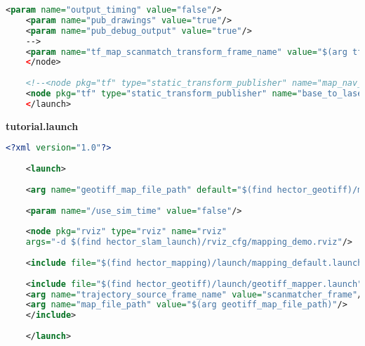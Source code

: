\begin{appendices}
\begin{lstlisting}[language=XML]
	<param name="output_timing" value="false"/>
	<param name="pub_drawings" value="true"/>
	<param name="pub_debug_output" value="true"/>
	-->
	<param name="tf_map_scanmatch_transform_frame_name" value="$(arg tf_map_scanmatch_transform_frame_name)" />
	</node>
	
	<!--<node pkg="tf" type="static_transform_publisher" name="map_nav_broadcaster" args="0 0 0 0 0 0 map nav 100"/>-->
	<node pkg="tf" type="static_transform_publisher" name="base_to_laser_broadcaster" args="0 0 0 0 0 0 base_frame laser_frame 100"/>
	</launch>
	\end{lstlisting}
	
	
	\textbf{tutorial.launch}
	\begin{lstlisting}[language=XML]
	<?xml version="1.0"?>
	
	<launch>
	
	<arg name="geotiff_map_file_path" default="$(find hector_geotiff)/maps"/>
	
	<param name="/use_sim_time" value="false"/>
	
	<node pkg="rviz" type="rviz" name="rviz"
	args="-d $(find hector_slam_launch)/rviz_cfg/mapping_demo.rviz"/>
	
	<include file="$(find hector_mapping)/launch/mapping_default.launch"/>
	
	<include file="$(find hector_geotiff)/launch/geotiff_mapper.launch">
	<arg name="trajectory_source_frame_name" value="scanmatcher_frame"/>
	<arg name="map_file_path" value="$(arg geotiff_map_file_path)"/>
	</include>
	
	</launch>
	\end{lstlisting}
\end{appendices}